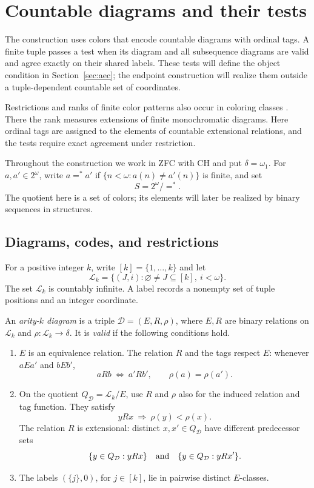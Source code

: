 \section{Countable diagrams and their tests}
\label{sec:colors}

The construction uses colors that encode countable diagrams with
ordinal tags.  A finite tuple passes a test when its diagram and all
subsequence diagrams are valid and agree exactly on their shared
labels.  These tests will define the object condition in
Section~\ref{sec:aec}; the endpoint construction will realize them
outside a tuple-dependent countable set of coordinates.

Restrictions and ranks of finite color patterns also occur in coloring
classes \cite[Definitions~1.1--1.7]{KolesnikovLambieHanson2016}.
There the rank measures extensions of finite monochromatic diagrams.
Here ordinal tags are assigned to the elements of countable extensional
relations, and the tests require exact agreement under restriction.

Throughout the construction we work in ZFC with CH and put
\(\delta=\omega_1\).  For \(a,a'\in 2^\omega\), write \(a=^*a'\) if
\(\{n<\omega:a(n)\ne a'(n)\}\) is finite, and set
\[
                         S=2^\omega/{=^*}.
\]
The quotient here is a set of colors; its elements will later be
realized by binary sequences in structures.

\subsection{Diagrams, codes, and restrictions}

For a positive integer \(k\), write \([k]=\{1,\ldots,k\}\) and let
\[
 \mathcal L_k
   =\{(J,i):\varnothing\ne J\subseteq[k],\ i<\omega\}.
\]
The set \(\mathcal L_k\) is countably infinite.  A label records a
nonempty set of tuple positions and an integer coordinate.

\begin{definition}\label{col:diagram}
An \emph{arity-\(k\) diagram} is a triple
\(\mathcal D=(E,R,\rho)\), where \(E,R\) are binary relations on
\(\mathcal L_k\) and \(\rho:\mathcal L_k\to\delta\).
It is \emph{valid} if the following conditions hold.
\begin{enumerate}[label=\textup{(\roman*)}]
\item
\(E\) is an equivalence relation.  The relation \(R\) and the tags
respect \(E\): whenever \(aEa'\) and \(bEb'\),
\[
 aRb\ \Longleftrightarrow\ a'Rb',
 \qquad
 \rho(a)=\rho(a').
\]
\item
On the quotient \(Q_{\mathcal D}=\mathcal L_k/E\), use \(R\) and
\(\rho\) also for the induced relation and tag function.  They satisfy
\[
                  yRx\ \Longrightarrow\ \rho(y)<\rho(x).
\]
The relation \(R\) is extensional: distinct \(x,x'\in Q_{\mathcal D}\)
have different predecessor sets
\[
 \{y\in Q_{\mathcal D}:yRx\}
 \quad\hbox{and}\quad
 \{y\in Q_{\mathcal D}:yRx'\}.
\]
\item
The labels \((\{j\},0)\), for \(j\in[k]\), lie in pairwise distinct
\(E\)-classes.
\end{enumerate}
\end{definition}

